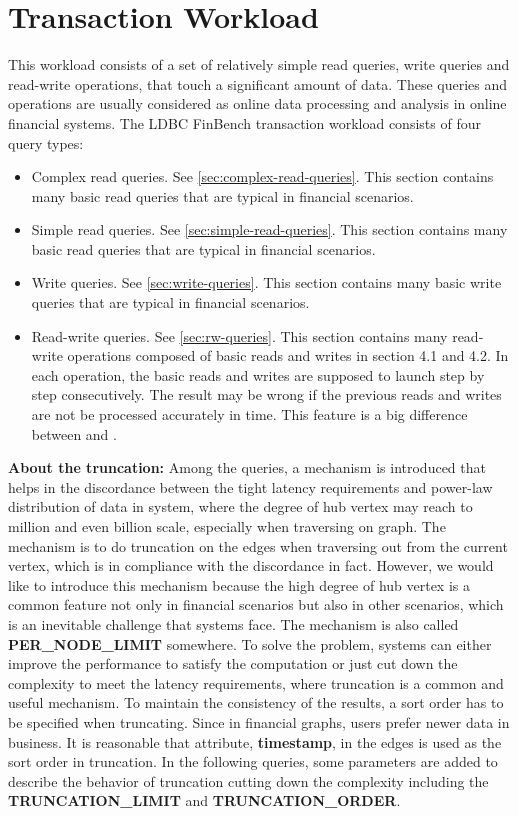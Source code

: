 \chapter{Transaction Workload}
\label{sec:transaction-workload}

This workload consists of a set of relatively simple read queries, write queries
and read-write operations, that touch a significant amount of data. These
queries and operations are usually considered as online data processing and
analysis in online financial systems. The LDBC FinBench transaction workload
consists of four query types:
\begin{itemize}
    \item Complex read queries. See \autoref{sec:complex-read-queries}. This
          section contains many basic read queries that are typical in financial
          scenarios.
    \item Simple read queries. See \autoref{sec:simple-read-queries}. This
          section contains many basic read queries that are typical in financial
          scenarios.
    \item Write queries. See \autoref{sec:write-queries}. This section contains
          many basic write queries that are typical in financial scenarios.
    \item Read-write queries. See \autoref{sec:rw-queries}. This section
          contains many read-write operations composed of basic reads and writes
          in section 4.1 and 4.2. In each operation, the basic reads and writes
          are supposed to launch step by step consecutively. The result may be
          wrong if the previous reads and writes are not be processed accurately
          in time. This feature is a big difference between \ldbcfinbench and
          \ldbcsnb.
\end{itemize}

{\flushleft \textbf{About the truncation:}} Among the queries, a mechanism is
introduced that helps in the discordance between the tight latency requirements
and power-law distribution of data in system, where the degree of hub vertex may
reach to million and even billion scale, especially when traversing on graph.
The mechanism is to do truncation on the edges when traversing out from the
current vertex, which is in compliance with the discordance in fact. However, we
would like to introduce this mechanism because the high degree of hub vertex is
a common feature not only in financial scenarios but also in other scenarios,
which is an inevitable challenge that systems face. The mechanism is also called
\textbf{PER\_NODE\_LIMIT} somewhere. To solve the problem, systems can either
improve the performance to satisfy the computation or just cut down the
complexity to meet the latency requirements, where truncation is a common and
useful mechanism. To maintain the consistency of the results, a sort order has
to be specified when truncating. Since in financial graphs, users prefer newer
data in business. It is reasonable that attribute, \textbf{timestamp}, in the
edges is used as the sort order in truncation. In the following queries, some
parameters are added to describe the behavior of truncation cutting down the
complexity including the \textbf{TRUNCATION\_LIMIT} and
\textbf{TRUNCATION\_ORDER}.

